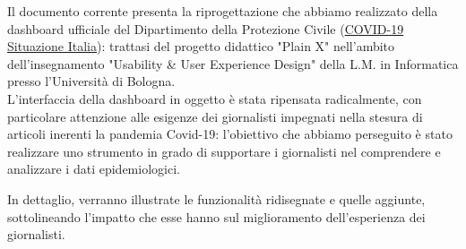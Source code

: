 \documentclass[../../main.tex]{subfiles}
\begin{document}
\begin{executive}

    Il documento corrente presenta la riprogettazione che abbiamo realizzato della dashboard ufficiale del Dipartimento della Protezione Civile (\href{https://opendatadpc.maps.arcgis.com/apps/opsdashboard/index.html#/b0c68bce2cce478eaac82fe38d4138b1}{COVID-19 Situazione Italia}): trattasi del progetto didattico "Plain X" nell'ambito dell'insegnamento "Usability \& User Experience Design" della L.M. in Informatica presso l'Università di Bologna.\\
    L'interfaccia della dashboard in oggetto è stata ripensata radicalmente, con particolare attenzione alle esigenze dei giornalisti impegnati nella stesura di articoli inerenti la pandemia Covid-19: l'obiettivo che abbiamo perseguito è stato realizzare uno strumento in grado di supportare i giornalisti nel comprendere e analizzare i dati epidemiologici.

    In dettaglio, verranno illustrate le funzionalità ridisegnate e quelle aggiunte, sottolineando l'impatto che esse hanno sul miglioramento dell'esperienza dei giornalisti.

\end{executive}
\end{document}
